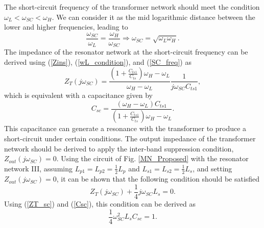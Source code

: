 \documentclass{IEEEtran}
\begin{document}

The short-circuit frequency of the transformer network should meet the condition $\omega_L < \omega_{SC} < \omega_H$. We can consider it as the mid logarithmic distance between the lower and higher frequencies, leading to
\begin{equation}
    \label{SC_freq}
    \frac{\omega_{SC}}{\omega_L} = \frac{\omega_H}{\omega_{SC}} \Rightarrow  \omega_{SC}= \sqrt{\omega_{L} \omega_{H}}. 
\end{equation}
The impedance of the resonator network at the short-circuit frequency can be derived using (\ref{Zins}), (\ref{wL_condition}), and (\ref{SC_freq}) as
\begin{equation}
    \label{ZT_sc}
    Z_{T}(j\omega_{SC}) = \frac{\left( 1 + \frac{C_{ts1}}{C_{ts}} \right) \omega_H - \omega_L}{\omega_H - \omega_L}  \frac{1}{j\omega_{SC} C_{ts1} },
\end{equation}
which is equivalent with a capacitance given by
\begin{equation}
    \label{Csc}
    C_{sc} = \frac{(\omega_H - \omega_L)C_{ts1}} {\left( 1 + \frac{C_{ts1}}{C_{ts}} \right) \omega_H - \omega_L}.
\end{equation}
This capacitance can generate a resonance with the transformer to produce a short-circuit under certain conditions. The output impedance of the transformer network should be derived to apply the inter-band suppression condition, $Z_{out}(j\omega_{SC}) = 0$. Using the circuit of Fig. \ref{MN_Proposed} with the resonator network III, assuming $L_{p1} = L_{p2} = \frac{1}{2} L_p$ and $L_{s1} = L_{s2} = \frac{1}{2} L_s$, and setting $Z_{out}(j\omega_{SC}) = 0$, it can be shown that the following condition should be satisfied
\begin{equation}
    \label{ZSC_condition}
    Z_{T}(j\omega_{SC}) + \frac{1}{4} j\omega_{SC} L_s = 0. 
\end{equation}
Using (\ref{ZT_sc}) and (\ref{Csc}), this condition can be derived as
\begin{equation}
    \label{wsc_resonance}
    \frac{1}{4} \omega_{SC}^2 L_{s} C_{sc} = 1.
\end{equation}
\end{document}
